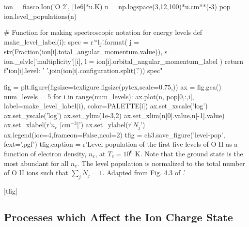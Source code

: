 \begin{pycode}[chapter3]
ion = fiasco.Ion('O 2', [1e6]*u.K)
n = np.logspace(3,12,100)*u.cm**(-3)
pop = ion.level_populations(n)

# Function for making spectroscopic notation for energy levels
def make_level_label(i):
    spec = r'$^{s}\mathrm{{{l}}}_{{{j}}}$'.format(
        j = str(Fraction(ion[i].total_angular_momentum.value)),
        s = ion._elvlc['multiplicity'][i],
        l = ion[i].orbital_angular_momentum_label
    )
    return f"{ion[i].level}: {' '.join(ion[i].configuration.split('.'))} {spec}"

fig = plt.figure(figsize=texfigure.figsize(pytex,scale=0.75,))
ax = fig.gca()
num_levels = 5
for i in range(num_levels):
    ax.plot(n, pop[0,:,i], label=make_level_label(i), color=PALETTE[i])
ax.set_xscale('log')
ax.set_yscale('log')
ax.set_ylim(1e-3,2)
ax.set_xlim(n[0].value,n[-1].value)
ax.set_xlabel(r'$n_e$ [cm$^{-3}$]')
ax.set_ylabel(r'$N_j$')
ax.legend(loc=4,frameon=False,ncol=2)
tfig = ch3.save_figure('level-pop', fext='.pgf')
tfig.caption = r'Level population of the first five levels of O II as a function of electron density, $n_e$, at $T_e=10^6$ K. Note that the ground state is the most abundant for all $n_e$. The level population is normalized to the total number of O II ions such that $\sum_jN_j=1$. Adapted from Fig. 4.3 of \citet{phillips_ultraviolet_2008}.'
\end{pycode}
\py[chapter3]|tfig|

\subsection{Processes which Affect the Ion Charge State}\label{subsec:ionization_recombination}

